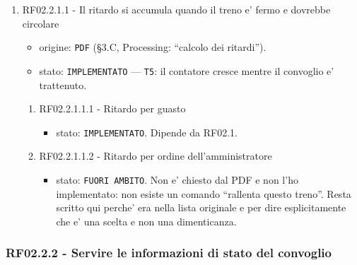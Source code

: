 \documentclass[11pt]{article}
\begin{document}
\begin{enumerate}
\item RF02.2.1.1 - Il ritardo si accumula quando il treno e' fermo e dovrebbe circolare
\label{sec:orgfcc88a3}
\begin{itemize}
\item origine: \texttt{PDF} (§3.C, Processing: ``calcolo dei ritardi'').
\item stato: \texttt{IMPLEMENTATO} — \texttt{T5}: il contatore cresce mentre il convoglio e' trattenuto.
\end{itemize}
\begin{enumerate}
\item RF02.2.1.1.1 - Ritardo per guasto
\label{sec:orgc2d34f1}
\begin{itemize}
\item stato: \texttt{IMPLEMENTATO}. Dipende da RF02.1.
\end{itemize}
\item RF02.2.1.1.2 - Ritardo per ordine dell'amministratore
\label{sec:orgb944438}
\begin{itemize}
\item stato: \texttt{FUORI AMBITO}. Non e' chiesto dal PDF e non l'ho implementato: non esiste un comando
``rallenta questo treno''. Resta scritto qui perche' era nella lista originale e per dire
esplicitamente che e' una scelta e non una dimenticanza.
\end{itemize}
\end{enumerate}
\end{enumerate}
\subsubsection{RF02.2.2 - Servire le informazioni di stato del convoglio}
\label{sec:org0b9a301}
\end{document}
